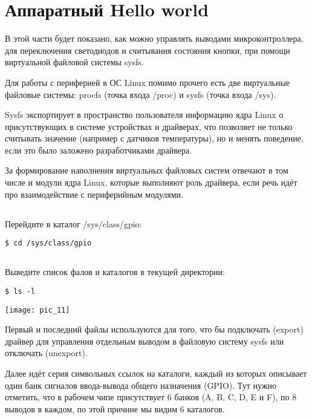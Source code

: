 \section{Аппаратный Hello world }

В этой части будет показано, как можно управлять выводами микроконтроллера, для переключения светодиодов и считывания состояния кнопки, при помощи виртуальной файловой системы sysfs.

Для работы с периферией в ОС Linux помимо прочего есть две виртуальные файловые системы: procfs (точка входа /proc) и sysfs (точка входа /sys).  

Sysfs экспортирует в пространство пользователя информацию ядра Linux о присутствующих в системе устройствах и драйверах, что позволяет не только считывать значение (например с датчиков температуры), но и менять поведение, если это было заложено разработчиками драйвера.

За формирование наполнения виртуальных файловых систем отвечают в том числе и модули ядра Linux, которые выполняют роль драйвера, если речь идёт про взаимодействие с периферийным модулями.

\subsection{}Перейдите в каталог /sys/class/gpio:
\begin{lstlisting}[style=bash]
$ cd /sys/class/gpio
\end{lstlisting}

\subsection{}Выведите список фалов и каталогов в текущей директории: 
\begin{lstlisting}[style=bash]
$ ls -l
\end{lstlisting}
\begin{center}
	\texttt{[image: pic\_11]}
\end{center}

Первый и последний файлы используются для того, что бы подключать (export) драйвер для управления отдельным выводом в файловую систему sysfs или отключать (unexport). 

Далее идёт серия символьных ссылок на каталоги, каждый из которых описывает один банк сигналов ввода-вывода общего назначения (GPIO). Тут нужно отметить, что в рабочем чипе присутствует 6 банков (A, B, C, D, E и F), по 8 выводов в каждом, по этой причине мы видим 6 каталогов.  

